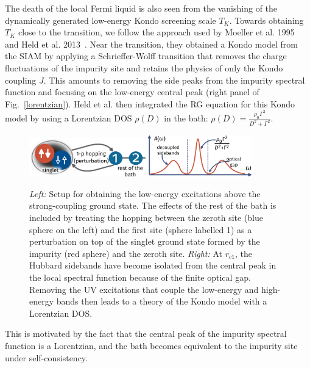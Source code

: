 \documentclass{iopart}
\begin{document}
The death of the local Fermi liquid is also seen from the vanishing of the dynamically generated low-energy Kondo screening scale \(T_K\). Towards obtaining $T_K$ close to the transition, we follow the approach used by Moeller et al. 1995~\cite{moeller_1995} and Held et al. 2013~\cite{held_2013}. Near the transition, they obtained a Kondo model from the SIAM by applying a Schrieffer-Wolff transition that removes the charge fluctuations of the impurity site and retains the physics of only the Kondo coupling \(J\). This amounts to removing the side peaks from the impurity spectral function and focusing on the low-energy central peak (right panel of Fig.~\eqref{lorentzian}). Held et al. then integrated the RG equation for this Kondo model by using a Lorentzian DOS \(\rho(D)\) in the bath: \(\rho(D) = \frac{\rho_0 \Gamma^2}{D^2 + \Gamma^2}\).
\begin{figure}[htpb]
	\includegraphics[width=0.45\textwidth]{perturbation.pdf}
	\hspace*{\fill}
	\includegraphics[width=0.4\textwidth]{lorentzian.pdf}
	\caption{{\it Left:} Setup for obtaining the low-energy excitations above the strong-coupling ground state. The effects of the rest of the bath is included by treating the hopping between the zeroth site (blue sphere on the left) and the first site (sphere labelled 1) as a perturbation on top of the singlet ground state formed by the impurity (red sphere) and the zeroth site. {\it Right:} At \(r_{c1}\), the Hubbard sidebands have become isolated from the central peak in the local spectral function because of the finite optical gap. Removing the UV excitations that couple the low-energy and high-energy bands then leads to a theory of the Kondo model with a Lorentzian DOS.}
	\label{lorentzian}
\end{figure}
This is motivated by the fact that the central peak of the impurity spectral function is a Lorentzian, and the bath becomes equivalent to the impurity site under self-consistency.
\end{document}
